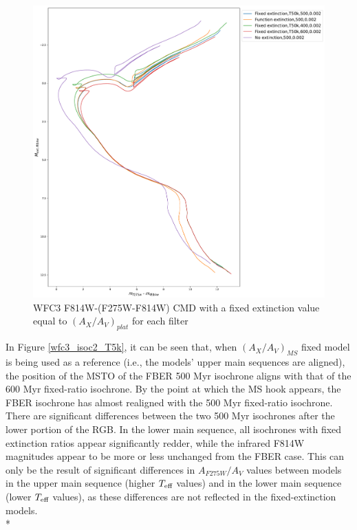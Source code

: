 \documentclass[12pt, a4paper]{report}
\begin{document}
\begin{figure}[h]
\begin{center}
\includegraphics[width=1.0\textwidth]{../basti_isochrones_10_13Gyr/Extinction_T50k_FeH0fix_func_f814w_f275wmf814w_500_400_600_Myr_FeH_0p002_ref_noext_Av_1p0.pdf}
\caption{WFC3 F814W-(F275W-F814W) CMD with a fixed extinction value equal to $(A_{X}/A_{V})_{plat}$ for each filter}
\label{wfc3_isoc2_T50k}
\end{center}
\end{figure}

In Figure \ref{wfc3_isoc2_T5k}, it can be seen that, when $(A_{X}/A_{V})_{MS}$ fixed model is being used as a reference (i.e., the models' upper main sequences are aligned), the position of the MSTO of the FBER 500 Myr isochrone aligns with that of the 600 Myr fixed-ratio isochrone. By the point at which the MS hook \citep{1998MNRAS.298..525P} appears, the FBER isochrone has almost realigned with the 500 Myr fixed-ratio isochrone. There are significant differences between the two 500 Myr isochrones after the lower portion of the RGB. In the lower main sequence, all isochrones with fixed extinction ratios appear significantly redder, while the infrared F814W magnitudes appear to be more or less unchanged from the FBER case. This can only be the result of significant differences in $A_{F275W}/A_{V}$ values between models in the upper main sequence (higher $T_{\textnormal{eff}}$ values) and in the lower main sequence (lower $T_{\textnormal{eff}}$ values), as these differences are not reflected in the fixed-extinction models. \\*
\end{document}
